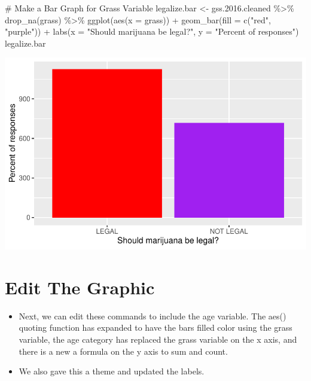 \documentclass[
  letterpaper,
  DIV=11,
  numbers=noendperiod]{scrreprt}
\newenvironment{Shaded}{\begin{snugshade}}{\end{snugshade}}
\newcommand{\AttributeTok}[1]{\textcolor[rgb]{0.40,0.45,0.13}{#1}}
\newcommand{\CommentTok}[1]{\textcolor[rgb]{0.37,0.37,0.37}{#1}}
\newcommand{\FloatTok}[1]{\textcolor[rgb]{0.68,0.00,0.00}{#1}}
\newcommand{\FunctionTok}[1]{\textcolor[rgb]{0.28,0.35,0.67}{#1}}
\newcommand{\NormalTok}[1]{\textcolor[rgb]{0.00,0.23,0.31}{#1}}
\newcommand{\OtherTok}[1]{\textcolor[rgb]{0.00,0.23,0.31}{#1}}
\newcommand{\SpecialCharTok}[1]{\textcolor[rgb]{0.37,0.37,0.37}{#1}}
\newcommand{\StringTok}[1]{\textcolor[rgb]{0.13,0.47,0.30}{#1}}
\providecommand{\tightlist}{%
  \setlength{\itemsep}{0pt}\setlength{\parskip}{0pt}}\usepackage{longtable,booktabs,array}
\begin{document}
\begin{Shaded}
\begin{Highlighting}[]
\CommentTok{\# Make a Bar Graph for Grass Variable}
\NormalTok{legalize.bar }\OtherTok{\textless{}{-}}\NormalTok{ gss.}\FloatTok{2016.}\NormalTok{cleaned }\SpecialCharTok{\%\textgreater{}\%}
    \FunctionTok{drop\_na}\NormalTok{(grass) }\SpecialCharTok{\%\textgreater{}\%}
    \FunctionTok{ggplot}\NormalTok{(}\FunctionTok{aes}\NormalTok{(}\AttributeTok{x =}\NormalTok{ grass)) }\SpecialCharTok{+} \FunctionTok{geom\_bar}\NormalTok{(}\AttributeTok{fill =} \FunctionTok{c}\NormalTok{(}\StringTok{"red"}\NormalTok{, }\StringTok{"purple"}\NormalTok{)) }\SpecialCharTok{+} \FunctionTok{labs}\NormalTok{(}\AttributeTok{x =} \StringTok{"Should marijuana be legal?"}\NormalTok{,}
    \AttributeTok{y =} \StringTok{"Percent of responses"}\NormalTok{)}
\NormalTok{legalize.bar}
\end{Highlighting}
\end{Shaded}

\includegraphics{dataviz_files/figure-pdf/unnamed-chunk-15-1.pdf}

\section{Edit The Graphic}\label{edit-the-graphic}

\begin{itemize}
\tightlist
\item
  Next, we can edit these commands to include the age variable. The
  aes() quoting function has expanded to have the bars filled color
  using the grass variable, the age category has replaced the grass
  variable on the x axis, and there is a new a formula on the y axis to
  sum and count.
\item
  We also gave this a theme and updated the labels.
\end{itemize}
\end{document}
